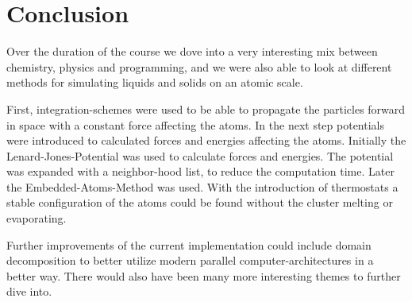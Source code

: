 \chapter{Conclusion}
\begin{comment}
- give look at stuff i did and did not
- mention all the other cool stuff, parralell hardware memes domain decompasition looking at other mechanical parameters ia stress
- should be written nice if i wanna work with those guys
-btw the github is actually hilarious although a c++ project over 80%
- personal ?! nah
\end{comment}

Over the duration of the course we dove into a very interesting mix between chemistry, physics and programming, and we were also able to look at different methods for simulating liquids and solids on an atomic scale.
\par 
First, integration-schemes were used to be able to propagate the particles forward in space with a constant force affecting the atoms. In the next step potentials were introduced to calculated forces and energies affecting the atoms. Initially the Lenard-Jones-Potential was used to calculate forces and energies. The potential was  expanded with a neighbor-hood list, to reduce the computation time. Later the Embedded-Atoms-Method was used. With the introduction of thermostats a stable configuration of the atoms could be found without the cluster melting or evaporating. 
\par
Further improvements of the current implementation could include domain decomposition to better utilize modern parallel computer-architectures in a better way. There would also have been many more interesting themes to further dive into.  
